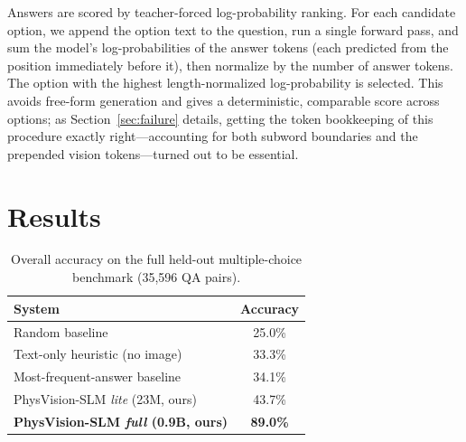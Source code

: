 \documentclass[11pt]{article}
\begin{document}
Answers are scored by teacher-forced log-probability ranking. For each candidate
option, we append the option text to the question, run a single forward pass, and
sum the model's log-probabilities of the answer tokens (each predicted from the
position immediately before it), then normalize by the number of answer tokens.
The option with the highest length-normalized log-probability is selected. This
avoids free-form generation and gives a deterministic, comparable score across
options; as Section~\ref{sec:failure} details, getting the token bookkeeping of
this procedure exactly right---accounting for both subword boundaries and the
prepended vision tokens---turned out to be essential.

\section{Results}
\label{sec:results}

\begin{table}[t]
\centering
\caption{Overall accuracy on the full held-out multiple-choice benchmark
(35{,}596 QA pairs).}
\label{tab:overall}
\begin{tabular}{lc}
\toprule
\textbf{System} & \textbf{Accuracy} \\
\midrule
Random baseline                 & 25.0\% \\
Text-only heuristic (no image)  & 33.3\% \\
Most-frequent-answer baseline   & 34.1\% \\
\midrule
PhysVision-SLM \emph{lite} (23M, ours) & 43.7\% \\
\textbf{PhysVision-SLM \emph{full} (0.9B, ours)} & \textbf{89.0\%} \\
\bottomrule
\end{tabular}
\end{table}
\end{document}
